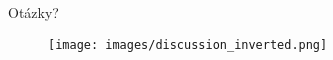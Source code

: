 \documentclass[14pt,aspectratio=169]{beamer}
\author{\authorname}
\begin{document}

    \begin{frame}
        \titlepage
    \end{frame}

    \begin{frame}{Otázky?}
        \begin{figure}
            \centering
            \texttt{[image: images/discussion\_inverted.png]}
        \end{figure}
    \end{frame}
\end{document}
